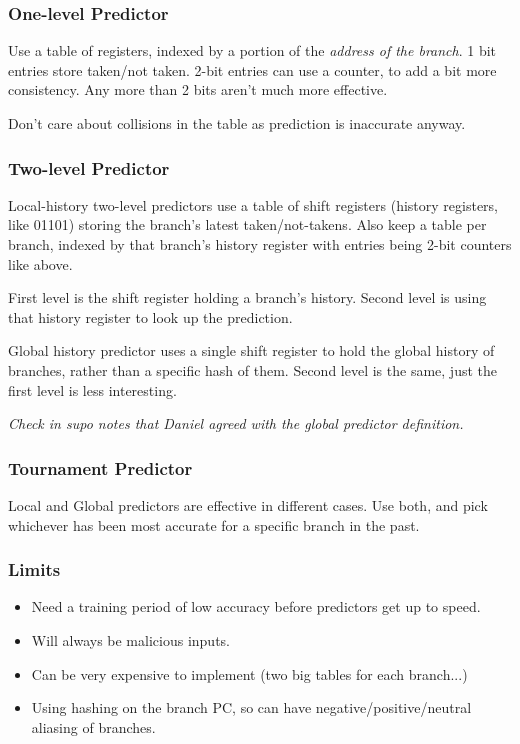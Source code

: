 \documentclass[a4paper,11pt]{article}
\begin{document}
{{        \subsubsection*{One-level Predictor}
        {
            Use a table of registers, indexed by a portion of the \textit{address of the branch}. 1 bit entries store taken/not taken. 2-bit entries can use a counter, to add a bit more consistency. Any more than 2 bits aren't much more effective.

            Don't care about collisions in the table as prediction is inaccurate anyway.
        }
        \subsubsection*{Two-level Predictor}
        {
            Local-history two-level predictors use a table of shift registers (history registers, like 01101) storing the branch's latest taken/not-takens. Also keep a table per branch, indexed by that branch's history register with entries being 2-bit counters like above.

            First level is the shift register holding a branch's history. Second level is using that history register to look up the prediction.

            Global history predictor uses a single shift register to hold the global history of branches, rather than a specific hash of them. Second level is the same, just the first level is less interesting.

            \textit{Check in supo notes that Daniel agreed with the global predictor definition.}
        }
        \subsubsection*{Tournament Predictor}
        {
            Local and Global predictors are effective in different cases. Use both, and pick whichever has been most accurate for a specific branch in the past.
        }
        \subsubsection*{Limits}
        {
            \begin{itemize}
            \item Need a training period of low accuracy before predictors get up to speed.
            \item Will always be malicious inputs.
            \item Can be very expensive to implement (two big tables for each branch...)
            \item Using hashing on the branch PC, so can have negative/positive/neutral aliasing of branches.
            \end{itemize}
        }
}}
\end{document}
